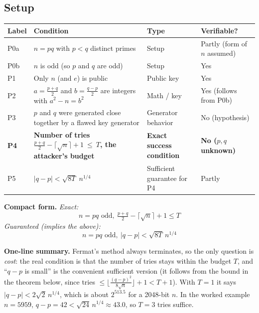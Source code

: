 \documentclass[11pt]{article}
\begin{document}
\subsection*{Setup}
\begin{center}
\begin{tabular}{@{}>{\raggedright\arraybackslash}p{1.1cm}>{\raggedright\arraybackslash}p{7.9cm}>{\raggedright\arraybackslash}p{3.4cm}>{\raggedright\arraybackslash}p{2.6cm}@{}}
\toprule
\textbf{Label} & \textbf{Condition} & \textbf{Type} & \textbf{Verifiable?} \\
\midrule
P0a & $n=pq$ with $p<q$ distinct primes & Setup & Partly (form of $n$ assumed) \\
P0b & $n$ is odd (so $p$ and $q$ are odd) & Setup & Yes \\
P1 & Only $n$ (and $e$) is public & Public key & Yes \\
P2 & $a=\tfrac{p+q}{2}$ and $b=\tfrac{q-p}{2}$ are integers with $a^2-n=b^2$ & Math / key & Yes (follows from P0b) \\
P3 & $p$ and $q$ were generated close together by a flawed key generator & Generator behavior & No (hypothesis) \\
\textbf{P4} & \textbf{Number of tries $\tfrac{p+q}{2}-\lceil\sqrt n\rceil+1\ \le\ T$, the attacker's budget} & \textbf{Exact success condition} & \textbf{No ($p,q$ unknown)} \\
P5 & $|q-p|<\sqrt{8T}\;n^{1/4}$ & Sufficient guarantee for P4 & Partly \\
\bottomrule
\end{tabular}
\end{center}

\textbf{Compact form.}
\emph{Exact:}
\[
\boxed{\;n=pq\text{ odd},\ \tfrac{p+q}{2}-\lceil\sqrt n\rceil+1\le T\;}
\]
\emph{Guaranteed (implies the above):}
\[
\boxed{\;n=pq\text{ odd},\ |q-p|<\sqrt{8T}\,n^{1/4}\;}
\]

\textbf{One-line summary.} Fermat's method always terminates, so the only question is \emph{cost}: the real condition is that the number of tries stays within the budget $T$, and ``$q-p$ is small'' is the convenient sufficient version (it follows from the bound in the theorem below, since tries $\le\lfloor\tfrac{(q-p)^2}{8\sqrt n}\rfloor+1<T+1$). With $T=1$ it says $|q-p|<2\sqrt2\,n^{1/4}$, which is about $2^{513.5}$ for a 2048-bit $n$. In the worked example $n=5959$, $q-p=42<\sqrt{24}\,n^{1/4}\approx43.0$, so $T=3$ tries suffice.
\end{document}
